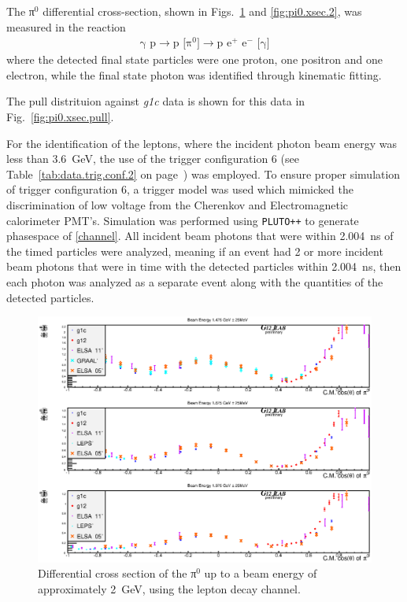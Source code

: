 The π$^0$ differential cross-section, shown in Figs.~\ref{fig:pi0.xsec.1} and \ref{fig:pi0.xsec.2}, was measured in the reaction
\begin{align}\label{channel}
\text{γ p} \rightarrow \text{p [π$^0$]} \rightarrow \text{p e$^+$ e$^-$ [γ]}
\end{align}
where the detected final state particles were one proton, one positron and one electron, while the final state photon was identified through kinematic fitting. \begin{v2}The pull distrituion against \textit{g1c} data is shown for this data in Fig.~\ref{fig:pi0.xsec.pull}.\end{v2} For the identification of the leptons, where the incident photon beam energy was less than 3.6~GeV, the use of the trigger configuration 6 (see Table~\ref{tab:data.trig.conf.2} on page~\pageref{tab:data.trig.conf.2}) was employed. To ensure proper simulation of trigger configuration 6, a trigger model was used which mimicked the discrimination of low voltage from the Cherenkov and Electromagnetic calorimeter PMT's. Simulation was performed using \verb#PLUTO++# to generate phasespace of \ref{channel}. All incident beam photons that were within 2.004~ns of the timed particles were analyzed, meaning if an event had 2 or more incident beam photons that were in time with the detected particles within 2.004~ns, then each photon was analyzed as a separate event along with the quantities of the detected particles.

\begin{figure}[htpb]\begin{center}
\includegraphics[width=0.95\columnwidth]{figures/xsec/G12_Pi0_XSection_forAnalysisNote_I.eps}
\caption{\label{fig:pi0.xsec.1}Differential cross section of the π$^0$ up to a beam energy of approximately 2~GeV, using the lepton decay channel.}
\end{center}\end{figure}

